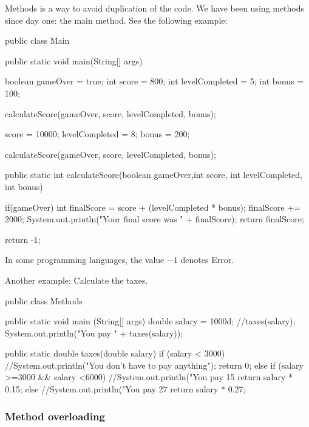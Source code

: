 Methods is a way to avoid duplication of the code. We have been using methods since day one: the main 
method. See the following example:
\begin{listing}{1}
public class Main {

    public static void main(String[] args) {
        boolean gameOver = true;
        int score = 800;
        int levelCompleted = 5;
        int bonus = 100;

        calculateScore(gameOver, score, levelCompleted, bonus);

        score = 10000;
        levelCompleted = 8;
        bonus = 200;

        calculateScore(gameOver, score, levelCompleted, bonus);


    }

    public static int calculateScore(boolean gameOver,int score, 
    int levelCompleted, int bonus) {

        if(gameOver) {
            int finalScore = score + (levelCompleted * bonus);
            finalScore += 2000;
            System.out.println("Your final score was " + finalScore);
            return finalScore;
        }

        return -1;

    }
}
\end{listing}
In some programming languages, the value \(-1\) denotes Error.

Another example: Calculate the taxes. 
\begin{listing}{1}
public class Methods {

    public static void main (String[] args) {
      double salary = 1000d;
      //taxes(salary);
      System.out.println("You pay " + taxes(salary));
    }

    public static double taxes(double salary) {
       if (salary < 3000) { 
           //System.out.println("You don't have to pay anything");
           return 0;} else if (salary >=3000 && salary <6000) {
           //System.out.println("You pay 15%
           return salary * 0.15;} else {
           //System.out.println("You pay 27%
           return salary * 0.27;
           }
    }
    
}
\end{listing}


\subsubsection{Method overloading}


